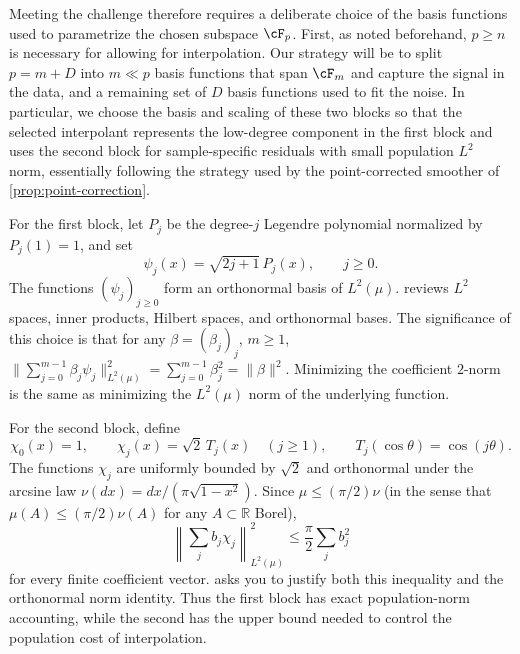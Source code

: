 \documentclass[11pt,twoside]{article}
\newcommand{\R}{\mathbb R}
\theoremstyle{definition}
\theoremstyle{remark}
\begin{document}
Meeting the challenge therefore requires a deliberate choice of the basis
functions used to parametrize the chosen subspace $\cF_p$. First, as noted beforehand,
$p\ge n$ is necessary for allowing for interpolation. 
Our strategy will be to split $p=m+D$ into
$m\ll p$ basis functions that span $\cF_m$ and capture the signal in the
data, and a remaining set of $D$ basis functions used to fit the noise.
In particular, we choose the basis and scaling of these two blocks so that the selected
interpolant represents the low-degree component in the first block and uses
the second block for sample-specific residuals with small population $L^2$
norm,
essentially 
following the strategy used by the point-corrected smoother of \cref{prop:point-correction}.

For the first block, let $P_j$ be the degree-$j$ Legendre polynomial
normalized by $P_j(1)=1$, and set
\[
 \psi_j(x)=\sqrt{2j+1}\,P_j(x),\qquad j\ge0.
\]
The functions $(\psi_j)_{j\ge0}$ form an orthonormal basis of $L^2(\mu)$.
 reviews $L^2$ spaces, inner products, Hilbert
spaces, and orthonormal bases.
The significance of this choice is that 
for any $\beta = (\beta_j)_j$, $m\ge 1$,
$\|\sum_{j=0}^{m-1} \beta_j \psi_j\|_{L^2(\mu)}^2 = \sum_{j=0}^{m-1} \beta_j^2 = \|\beta\|^2$.
Minimizing the coefficient $2$-norm is the same as minimizing the $L^2(\mu)$ norm of the underlying function.

For the second block, define
\[
 \chi_0(x)=1,\qquad
 \chi_j(x)=\sqrt2\,T_j(x)\quad(j\ge1),\qquad
 T_j(\cos\theta)=\cos(j\theta).
\]
The functions $\chi_j$ are uniformly bounded by $\sqrt2$ and orthonormal
under the arcsine law $\nu(dx)=dx/(\pi\sqrt{1-x^2})$. Since
$\mu\le(\pi/2)\nu$ (in the sense that $\mu(A)\le (\pi/2)\nu(A)$ for any $A\subset \R$ Borel),
\begin{equation}
 \left\|\sum_jb_j\chi_j\right\|_{L^2(\mu)}^2
 \le\frac\pi2\sum_jb_j^2
 \label{eq:chebyshev-synthesis}
\end{equation}
for every finite coefficient vector. 
asks you to justify both this inequality and the orthonormal norm identity.
Thus the first block has exact
population-norm accounting, while the second has the upper bound needed to
control the population cost of interpolation.
\end{document}
